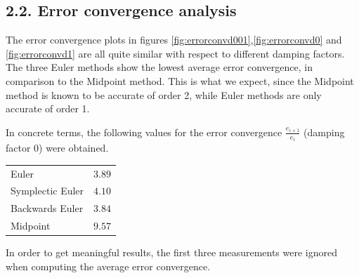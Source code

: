 \subsection*{2.2. Error convergence analysis}
The error convergence plots in figures \ref{fig:errorconvd001},\ref{fig:errorconvd0} and \ref{fig:errorconvd1} are all quite similar with respect to different damping factors. The three Euler methods show the lowest average error convergence, in comparison to the Midpoint method. This is what we expect, since the Midpoint method is known to be accurate of order 2, while Euler methods are only accurate of order 1.

In concrete terms, the following values for the error convergence $\frac{e_{i+1}}{e_i}$ (damping factor 0) were obtained.
\begin{center}
	\begin{tabular}{ll}
		\toprule
		Euler			& $3.89$\\
		Symplectic Euler	& $4.10$\\
		Backwards Euler		& $3.84$\\
		Midpoint		& $9.57$\\
		\bottomrule
	\end{tabular}
\end{center}
In order to get meaningful results, the first three measurements were ignored when computing the average error convergence.


